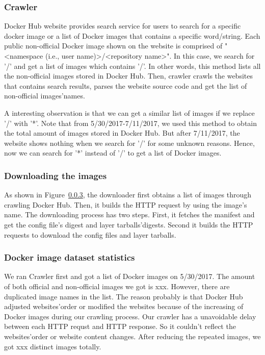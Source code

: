 \subsubsection{Crawler}

Docker Hub website provides search service for users to search for a specific docker image or a list of Docker images that contains a specific word/string. Each public non-official Docker image shown on the website is comprised of "<namespace (i.e., user name)>/<repository name>". In this case, we search for '/' and get a list of images which contains '/'. In other words, this method lists all the non-official images stored in Docker Hub. Then, crawler crawls the websites that contains search results, parses the website source code and get the list of non-official images'names. 

A interesting observation is that we can get a similar list of images if we replace '/' with '*'. Note that from 5/30/2017-7/11/2017, we used this method to obtain the total amount of images stored in Docker Hub. But after 7/11/2017, the website shows nothing when we search for '/' for some unknown reasons. Hence, now we can search for '*' instead of '/' to get a list of Docker images.


\subsubsection{Downloading the images}

As shown in Figure~\ref{}, the downloader first obtains a list of images through crawling Docker Hub. Then, it builds the HTTP request by using the image's name. The downloading process has two steps. First, it fetches the manifest and get the config file's digest and layer tarballs'digests. Second it builds the HTTP requests to download the config files and layer tarballs.

\subsubsection{Docker image dataset statistics}

We ran Crawler first and got a list of Docker images on 5/30/2017. The amount of both official and non-official images we got is xxx. However, there are duplicated image names in the list. The reason probably is that Docker Hub adjusted websites'order or modified the websites because of the increasing of Docker images during our crawling process. Our crawler has a unavoidable delay between each HTTP requst and HTTP response. So it couldn't reflect the websites'order or website content changes. After reducing the repeated images, we got xxx distinct images totally. 


